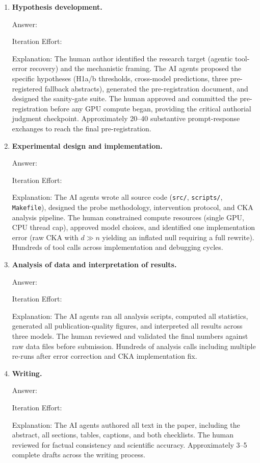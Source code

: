 \documentclass{article}
\begin{document}
\begin{enumerate}

\item \textbf{Hypothesis development.}

Answer: \involvementC{}

Iteration Effort: \iterationMedium{}

Explanation: The human author identified the research target (agentic
tool-error recovery) and the mechanistic framing.
The AI agents proposed the specific hypotheses (H1a/b thresholds,
cross-model predictions, three pre-registered fallback abstracts),
generated the pre-registration document, and designed the
sanity-gate suite.
The human approved and committed the pre-registration before any GPU
compute began, providing the critical authorial judgment checkpoint.
Approximately 20--40 substantive prompt-response exchanges to reach
the final pre-registration.

\item \textbf{Experimental design and implementation.}

Answer: \involvementD{}

Iteration Effort: \iterationHigh{}

Explanation: The AI agents wrote all source code
(\texttt{src/}, \texttt{scripts/}, \texttt{Makefile}), designed the
probe methodology, intervention protocol, and CKA analysis pipeline.
The human constrained compute resources (single GPU, CPU thread cap),
approved model choices, and identified one implementation error
(raw CKA with $d{\gg}n$ yielding an inflated null requiring a full
rewrite). Hundreds of tool calls across implementation and
debugging cycles.

\item \textbf{Analysis of data and interpretation of results.}

Answer: \involvementD{}

Iteration Effort: \iterationHigh{}

Explanation: The AI agents ran all analysis scripts, computed all
statistics, generated all publication-quality figures, and interpreted
all results across three models. The human reviewed and validated the
final numbers against raw data files before submission.
Hundreds of analysis calls including multiple re-runs after
error correction and CKA implementation fix.

\item \textbf{Writing.}

Answer: \involvementD{}

Iteration Effort: \iterationMedium{}

Explanation: The AI agents authored all text in the paper, including
the abstract, all sections, tables, captions, and both checklists.
The human reviewed for factual consistency and scientific accuracy.
Approximately 3--5 complete drafts across the writing process.

\end{enumerate}
\end{document}
